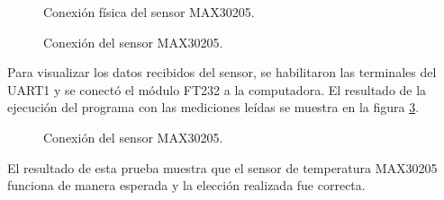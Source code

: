 \begin{figure}[htbp!]
	\centering
	\caption{Conexión física del sensor MAX30205.}
	\label{fig:ConexionFisicaMAX30205}
\end{figure}

\begin{figure}[htbp!]
	\centering
	\caption{Conexión del sensor MAX30205.}
	\label{fig:ConexionMAX30205}
\end{figure}

Para visualizar los datos recibidos del sensor, se habilitaron las terminales del UART1 y se conectó el módulo FT232 a la computadora. El resultado de la ejecución del programa con las mediciones leídas se muestra en la figura \ref{fig:ResultadoTerminalMAX30205}.\\


\begin{figure}[htbp!]
	\centering
	\caption{Conexión del sensor MAX30205.}
	\label{fig:ResultadoTerminalMAX30205}
\end{figure}

El resultado de esta prueba muestra que el sensor de temperatura MAX30205 funciona de manera esperada y la elección realizada fue correcta.

\clearpage
